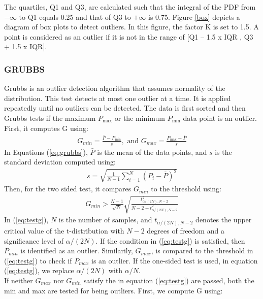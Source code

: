 The quartiles, Q1 and Q3, are calculated such that the integral of the PDF from $-\infty$ to Q1 equals 0.25 and that of Q3 to $+ \infty$ is 0.75.
Figure \ref{box} depicts a diagram of box plots to detect outliers. In this figure, the factor K is set to 1.5. A point is considered as an outlier if it is not in the range of [Q1 – 1.5 x IQR , Q3 + 1.5 x IQR].\\

\subsubsection{GRUBBS}

Grubbs \cite{grubbs}\cite{stefansky} is an outlier detection algorithm that assumes normality of the distribution. This test detects at most one outlier at a time. It is applied repeatedly until no outliers can be detected. The data is first sorted and then Grubbs tests if the maximum $P_{\max }$ or the minimum $P_{\min }$ data point is an outlier.\\ First, it computes G using:\\
\begin{eqnarray}\label{eq:grubbs}
G_{min}={\frac  {{\bar  {P}}-P_{\min }}{s}} , \text{ and   }
G_{max}={\frac  {P_{\max }-{\bar  {P}}}{s}}
\end{eqnarray}
In Equations (\ref{eq:grubbs}), $\bar{P}$ is the mean of the data points, and $s$ is the standard deviation  computed using:
\begin{eqnarray}\label{std}
s= \sqrt{\frac{1}{N-1}\sum_{i=1}^{N}(P_i-\bar{P})^2}
\end{eqnarray} 
Then, for the two sided test, it compares $G_{min}$  to the threshold using:
\begin{eqnarray}\label{eq:testg}
 G_{min}>{\frac  {N-1}{{\sqrt  {N}}}}{\sqrt  {{\frac  {t_{{\alpha /(2N),N-2}}^{2}}{N-2+t_{{\alpha /(2N),N-2}}^{2}}}}} 
\end{eqnarray}
In (\ref{eq:testg}), $N$ is the number of samples, and $t_{\alpha/(2N),N - 2}$ denotes the upper critical value of the t-distribution with $N - 2$ degrees of freedom and a significance level of $\alpha/(2N)$. If the condition in (\ref{eq:testg}) is satisfied, then $P_{min}$ is identified as an outlier.
Similarily, $G_{max}$, is compared to the threshold in (\ref{eq:testg}) to check if $P_{max}$ is an outlier.
If the one-sided test is used, in equation (\ref{eq:testg}), we replace $\alpha/(2N)$ with $\alpha/N$.
\\
If neither $G_{max}$ nor $G_{min}$ satisfy the in equation (\ref{eq:testg})  are passed, both the min and max are tested for being outliers. First, we compute G using:
